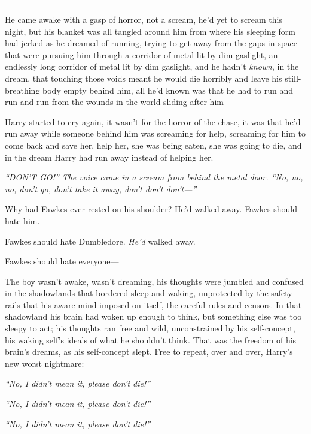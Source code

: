 \begin{center}\rule{3in}{0.4pt}\end{center}

He came awake with a gasp of horror, not a scream, he'd yet to scream
this night, but his blanket was all tangled around him from where his
sleeping form had jerked as he dreamed of running, trying to get away
from the gaps in space that were pursuing him through a corridor of
metal lit by dim gaslight, an endlessly long corridor of metal lit by
dim gaslight, and he hadn't \emph{known}, in the dream, that touching
those voids meant he would die horribly and leave his still-breathing
body empty behind him, all he'd known was that he had to run and run and
run from the wounds in the world sliding after him---

Harry started to cry again, it wasn't for the horror of the chase, it
was that he'd run away while someone behind him was screaming for help,
screaming for him to come back and save her, help her, she was being
eaten, she was going to die, and in the dream Harry had run away instead
of helping her.

\emph{``DON'T GO!'' The voice came in a scream from behind the metal
door. ``No, no, no, don't go, don't take it away, don't don't
don't---''}

Why had Fawkes ever rested on his shoulder? He'd walked away. Fawkes
should hate him.

Fawkes should hate Dumbledore. \emph{He'd} walked away.

Fawkes should hate everyone---

The boy wasn't awake, wasn't dreaming, his thoughts were jumbled and
confused in the shadowlands that bordered sleep and waking, unprotected
by the safety rails that his aware mind imposed on itself, the careful
rules and censors. In that shadowland his brain had woken up enough to
think, but something else was too sleepy to act; his thoughts ran free
and wild, unconstrained by his self-concept, his waking self's ideals of
what he shouldn't think. That was the freedom of his brain's dreams, as
his self-concept slept. Free to repeat, over and over, Harry's new worst
nightmare:

\emph{``No, I didn't mean it, please don't die!''}

\emph{``No, I didn't mean it, please don't die!''}

\emph{``No, I didn't mean it, please don't die!''}

